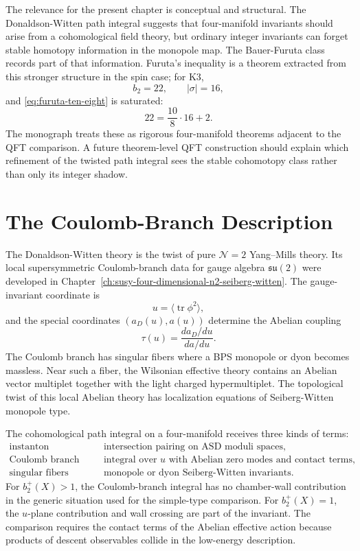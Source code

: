 The relevance for the present chapter is conceptual and structural.  The
Donaldson-Witten path integral suggests that four-manifold invariants should
arise from a cohomological field theory, but ordinary integer invariants can
forget stable homotopy information in the monopole map.  The Bauer-Furuta
class records part of that information.  Furuta's inequality is a theorem
extracted from this stronger structure in the spin case; for K3,
\[
  b_2=22,\qquad |\sigma|=16,
\]
and \eqref{eq:furuta-ten-eight} is saturated:
\[
  22=\frac{10}{8}\cdot16+2.
\]
The monograph treats these as rigorous four-manifold theorems adjacent to
the QFT comparison.  A future theorem-level QFT construction should explain
which refinement of the twisted path integral sees the stable cohomotopy
class rather than only its integer shadow.

\section{The Coulomb-Branch Description}

The Donaldson-Witten theory is the twist of pure \(\mathcal N=2\) Yang--Mills
theory.  Its local supersymmetric Coulomb-branch data for gauge algebra
\(\mathfrak{su}(2)\) were developed in
Chapter~\ref{ch:susy-four-dimensional-n2-seiberg-witten}.  The gauge-invariant
coordinate is
\[
  u=\langle\operatorname{tr}\phi^2\rangle ,
\]
and the special coordinates \((a_D(u),a(u))\) determine the Abelian coupling
\[
  \tau(u)=\frac{da_D/du}{da/du}.
\]
The Coulomb branch has singular fibers where a BPS monopole or dyon becomes
massless.  Near such a fiber, the Wilsonian effective theory contains an
Abelian vector multiplet together with the light charged hypermultiplet.  The
topological twist of this local Abelian theory has localization equations of
Seiberg-Witten monopole type.

The cohomological path integral on a four-manifold receives three kinds of
terms:
\[
\begin{array}{ll}
  \text{instanton description} &
  \text{intersection pairing on ASD moduli spaces},\\[2mm]
  \text{Coulomb branch} &
  \text{integral over }u\text{ with Abelian zero modes and contact terms},\\[2mm]
  \text{singular fibers} &
  \text{monopole or dyon Seiberg-Witten invariants}.
\end{array}
\]
For \(b_2^+(X)>1\), the Coulomb-branch integral has no chamber-wall
contribution in the generic situation used for the simple-type comparison.
For \(b_2^+(X)=1\), the \(u\)-plane contribution and wall crossing are part of
the invariant.  The comparison requires the contact terms of the Abelian
effective action because products of descent observables collide in the
low-energy description.

